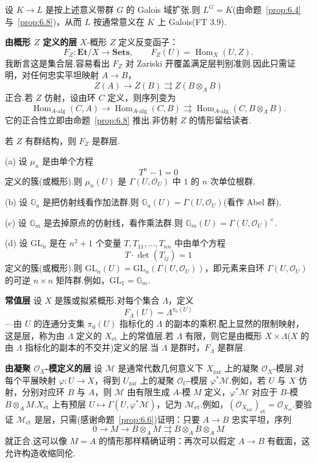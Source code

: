 \begin{remark}\label{rem:6.9}
设 $K \to L$ 是按上述意义带群 $G$ 的 Galois 域扩张.则 $L^{G} = K$(由命题~\ref{prop:6.4} 与~\ref{prop:6.8})，从而 $L$ 按通常意义在 $K$ 上 Galois(FT 3.9).
\end{remark}

\textbf{由概形 $Z$ 定义的层} $X$-概形 $Z$ 定义反变函子：
\[
F_Z \colon \mathbf{Et}/X \to \mathbf{Sets}, \qquad F_Z(U) = \operatorname{Hom}_X(U, Z).
\]
我断言这是集合层.容易看出 $F_Z$ 对 Zariski 开覆盖满足层判别准则.因此只需证明，对任何忠实平坦映射 $A \to B$，
\[
Z(A) \to Z(B) \rightrightarrows Z(B \otimes_{A} B)
\]
正合.若 $Z$ 仿射，设由环 $C$ 定义，则序列变为
\[
\operatorname{Hom}_{A\text{-alg}}(C, A) \to \operatorname{Hom}_{A\text{-alg}}(C, B) \rightrightarrows \operatorname{Hom}_{A\text{-alg}}(C, B \otimes_{A} B).
\]
它的正合性立即由命题~\ref{prop:6.8} 推出.非仿射 $Z$ 的情形留给读者.

若 $Z$ 有群结构，则 $F_Z$ 是群层.

\begin{example}\label{ex:6.10}
(a) 设 $\mu_n$ 是由单个方程
\[
T^{n} - 1 = 0
\]
定义的簇(或概形).则 $\mu_n(U)$ 是 $\Gamma(U, \mathcal{O}_U)$ 中 $1$ 的 $n$ 次单位根群.

(b) 设 $\mathbb{G}_{a}$ 是把仿射线看作加法群.则 $\mathbb{G}_{a}(U) = \Gamma(U, \mathcal{O}_U)$(看作 Abel 群).

(c) 设 $\mathbb{G}_{m}$ 是去掉原点的仿射线，看作乘法群.则 $\mathbb{G}_{m}(U) = \Gamma(U, \mathcal{O}_U)^{\times}$.

(d) 设 $\mathrm{GL}_n$ 是在 $n^{2} + 1$ 个变量 $T, T_{11}, \ldots, T_{nn}$ 中由单个方程
\[
T \cdot \det(T_{ij}) = 1
\]
定义的簇(或概形).则 $\mathrm{GL}_n(U) = \mathrm{GL}_n(\Gamma(U, \mathcal{O}_U))$，即元素来自环 $\Gamma(U, \mathcal{O}_U)$ 的可逆 $n \times n$ 矩阵群.例如，$\mathrm{GL}_1 = \mathbb{G}_{m}$.
\end{example}

\textbf{常值层} 设 $X$ 是簇或拟紧概形.对每个集合 $\Lambda$，定义
\[
F_{\Lambda}(U) = \Lambda^{\pi_0(U)}
\]
---由 $U$ 的连通分支集 $\pi_0(U)$ 指标化的 $\Lambda$ 的副本的乘积.配上显然的限制映射，这是层，称为由 $\Lambda$ 定义的 $X_{\mathrm{et}}$ 上的常值层.若 $\Lambda$ 有限，则它是由概形 $X \times \Lambda$($X$ 的由 $\Lambda$ 指标化的副本的不交并)定义的层.当 $\Lambda$ 是群时，$F_{\Lambda}$ 是群层.

\textbf{由凝聚 $\mathcal{O}_X$-模定义的层} 设 $\mathcal{M}$ 是通常代数几何意义下 $X_{\mathrm{zar}}$ 上的凝聚 $\mathcal{O}_X$-模层.对每个平展映射 $\varphi \colon U \to X$，得到 $U_{\mathrm{zar}}$ 上的凝聚 $\mathcal{O}_U$-模层 $\varphi^{*}\mathcal{M}$.例如，若 $U$ 与 $X$ 仿射，分别对应环 $B$ 与 $A$，则 $\mathcal{M}$ 由有限生成 $A$-模 $M$ 定义，$\varphi^{*}\mathcal{M}$ 对应于 $B$-模 $B \otimes_{A} M$.$X_{\mathrm{et}}$ 上有预层 $U \mapsto \Gamma(U, \varphi^{*}\mathcal{M})$，记为 $\mathcal{M}_{\mathrm{et}}$.例如，$(\mathcal{O}_{X_{\mathrm{zar}}})_{\mathrm{et}} = \mathcal{O}_{X_{\mathrm{et}}}$.要验证 $\mathcal{M}_{\mathrm{et}}$ 是层，只需(感谢命题~\ref{prop:6.6})证明：只要 $A \to B$ 忠实平坦，序列
\[
0 \to M \to B \otimes_{A} M \rightrightarrows B \otimes_{A} B \otimes_{A} M
\]
就正合.这可以像 $M = A$ 的情形那样精确证明：再次可以假定 $A \to B$ 有截面，这允许构造收缩同伦.


